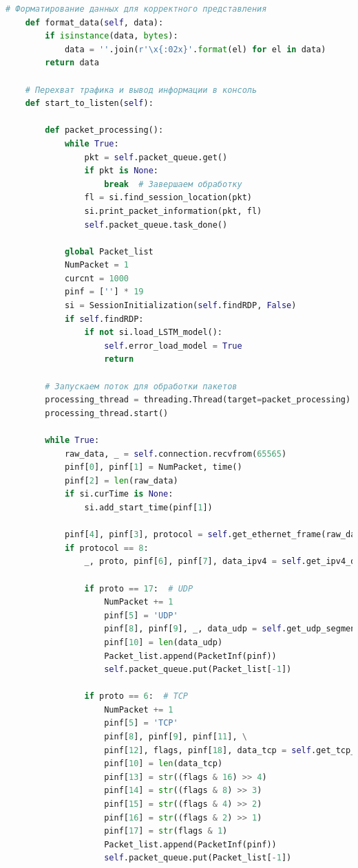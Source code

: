 \documentclass[bachelor, och, coursework]{SCWorks}
\begin{document}
\begin{lstlisting}[language=Python]
    # Форматирование данных для корректного представления
    def format_data(self, data):
        if isinstance(data, bytes):
            data = ''.join(r'\x{:02x}'.format(el) for el in data)
        return data

    # Перехват трафика и вывод информации в консоль
    def start_to_listen(self):
        
        def packet_processing():
            while True:
                pkt = self.packet_queue.get()
                if pkt is None:
                    break  # Завершаем обработку
                fl = si.find_session_location(pkt)
                si.print_packet_information(pkt, fl)
                self.packet_queue.task_done()

            global Packet_list
            NumPacket = 1
            curcnt = 1000
            pinf = [''] * 19
            si = SessionInitialization(self.findRDP, False)
            if self.findRDP:
                if not si.load_LSTM_model():
                    self.error_load_model = True
                    return

        # Запускаем поток для обработки пакетов
        processing_thread = threading.Thread(target=packet_processing)
        processing_thread.start()

        while True:
            raw_data, _ = self.connection.recvfrom(65565)
            pinf[0], pinf[1] = NumPacket, time()
            pinf[2] = len(raw_data)
            if si.curTime is None:
                si.add_start_time(pinf[1])

            pinf[4], pinf[3], protocol = self.get_ethernet_frame(raw_data)
            if protocol == 8:
                _, proto, pinf[6], pinf[7], data_ipv4 = self.get_ipv4_data(raw_data[14:])

                if proto == 17:  # UDP
                    NumPacket += 1
                    pinf[5] = 'UDP'
                    pinf[8], pinf[9], _, data_udp = self.get_udp_segment(data_ipv4)
                    pinf[10] = len(data_udp)
                    Packet_list.append(PacketInf(pinf))
                    self.packet_queue.put(Packet_list[-1])

                if proto == 6:  # TCP
                    NumPacket += 1
                    pinf[5] = 'TCP'
                    pinf[8], pinf[9], pinf[11], \
                    pinf[12], flags, pinf[18], data_tcp = self.get_tcp_segment(data_ipv4)
                    pinf[10] = len(data_tcp)
                    pinf[13] = str((flags & 16) >> 4)
                    pinf[14] = str((flags & 8) >> 3)
                    pinf[15] = str((flags & 4) >> 2)
                    pinf[16] = str((flags & 2) >> 1)
                    pinf[17] = str(flags & 1)
                    Packet_list.append(PacketInf(pinf))
                    self.packet_queue.put(Packet_list[-1])


\end{lstlisting}
\end{document}
